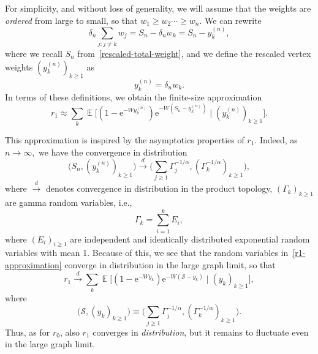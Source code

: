 \documentclass[ twocolumn,
 amsmath,amssymb,
 aps, pre, amsthm, amsfonts,
]{revtex4-2}
\DeclareMathOperator{\EX}{\mathbb{E}}%
\newcommand{\e}{\mathrm{e}}
\newcommand{\sss}{\scriptscriptstyle}
\newcommand{\convd}{\stackrel{d}{\longrightarrow}}
\begin{document}
For simplicity, and without loss of generality, we will assume that the weights are {\em ordered} from large to small, so that $w_1\geq w_2\cdots\geq w_n$. We can rewrite
    \begin{equation}
        \delta_n\sum_{j\colon j\neq k} w_j
        =S_n-\delta_nw_k
        =S_n-y_k^{\sss(n)},
    \end{equation}
where we recall $S_n$ from~\eqref{rescaled-total-weight}, and we define the rescaled vertex weights $(y_k^{\sss(n)})_{k\geq 1}$ as
    \begin{equation}
    \label{ordered-resceled-weights}
        y_k^{\sss(n)}=\delta_nw_k.
    \end{equation}
In terms of these definitions, we obtain the finite-size approximation
    \begin{equation}
    \label{r1-approximation}
     r_1   \approx  \sum_{k}
    \EX\Big[(1-\e^{- W y_k^{\sss(n)}})
    \e^{-W (S_n- y_k^{\sss(n)})}\mid (y_k^{\sss(n)})_{k\geq 1}\Big].
    \end{equation}

    
This approximation is inspired by the asymptotics properties of $r_1$. Indeed, as $n\rightarrow \infty,$ we have the convergence in distribution 
    \begin{equation}
    \label{conv-sum-Pareto-order-statistics}
    \Big(S_n, (y_k^{\sss(n)})_{k\geq 1}\Big)
    \convd \Big(\sum_{j\geq 1} \Gamma_j^{-1/\alpha}, 
    (\Gamma_k^{-1/\alpha})_{k\geq 1}\Big),
    \end{equation}
where $\convd$ denotes convergence in distribution in the product topology, $(\Gamma_k)_{k\geq 1}$ are gamma random variables, i.e.,
    \begin{equation}
    \Gamma_k=\sum_{i=1}^k E_i,
    \end{equation}
where $(E_i)_{i\geq 1}$ are independent and identically distributed exponential random variables with mean 1. Because of this, we see that the random variables in~\eqref{r1-approximation} converge in distribution in the large graph limit, so that
    \begin{equation}
    r_1\convd 
    \sum_{k}
    \EX\Big[(1-\e^{- W y_k})
    \e^{-W (\mathcal{S}- y_k)}\mid (y_k)_{k\geq 1}\Big],
    \end{equation}
where
    \begin{equation}
     \Big(\mathcal{S}, (y_k)_{k\geq 1}\Big)
     \equiv \Big(\sum_{j\geq 1} \Gamma_j^{-1/\alpha}, 
    (\Gamma_k^{-1/\alpha})_{k\geq 1}\Big).
    \end{equation}
Thus, as for $r_0$, also $r_1$ converges in {\em distribution}, but it remains to fluctuate even in the large graph limit. 
\smallskip
\end{document}
